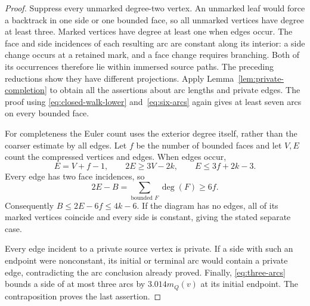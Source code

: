\begin{proof}
Suppress every unmarked degree-two vertex.  An unmarked leaf would
force a backtrack in one side or one bounded face, so all unmarked
vertices have degree at least three.  Marked vertices have degree at
least one when edges occur.  The face and side incidences of each
resulting arc are constant along its interior: a side change occurs at
a retained mark, and a face change requires branching.  Both of its
occurrences therefore lie within immersed source paths.  The preceding
reductions show they have different projections.  Apply
Lemma~\ref{lem:private-completion} to obtain all the assertions about
arc lengths and private edges.  The proof using
\eqref{eq:closed-walk-lower} and~\eqref{eq:six-arcs} again gives at least
seven arcs on every bounded face.

For completeness the Euler count uses the exterior degree itself,
rather than the coarser estimate by all edges.  Let $f$ be the number
of bounded faces and let $V,E$ count the compressed vertices and edges.
When edges occur,
\[
 E=V+f-1,\qquad 2E\ge3V-2k,\qquad E\le3f+2k-3.
\]
Every edge has two face incidences, so
\[
 2E-B=\sum_{\text{bounded }F}\deg(F)\ge6f.
\]
Consequently $B\le2E-6f\le4k-6$.  If the diagram has no edges, all
of its marked vertices coincide and every side is constant, giving
the stated separate case.

Every edge incident to a private source vertex is private.  If a side
with such an endpoint were nonconstant, its initial or terminal arc
would contain a private edge, contradicting the arc conclusion already
proved.  Finally, \eqref{eq:three-arcs} bounds a side of at most three
arcs by $3.014m_Q(v)$ at its initial endpoint.  The contraposition proves
the last assertion.
\end{proof}
